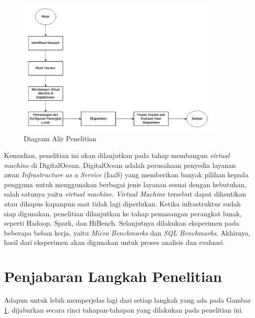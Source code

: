 \begin{figure}[h!]
    \centering
    \includegraphics[width=0.9\textwidth]{figures/ch03/Diagram Tugas Akhir.png}
    \caption{Diagram Alir Penelitian}
    \label{fig:diagram alir}
\end{figure}

Kemudian, penelitian ini akan dilanjutkan pada tahap membangun \textit{virtual machine} di DigitalOcean. DigitalOcean adalah perusahaan penyedia layanan awan \textit{Infrastructure as a Service} (IaaS) yang memberikan banyak pilihan kepada pengguna untuk menggunakan berbagai jenis layanan sesuai dengan kebutuhan, salah satunya yaitu \textit{virtual machine}. \textit{Virtual Machine} tersebut dapat dihentikan atau dihapus kapanpun saat tidak lagi diperlukan. Ketika infrastruktur sudah siap digunakan, penelitian dilanjutkan ke tahap pemasangan perangkat lunak, seperti Hadoop, Spark, dan HiBench. Selanjutnya dilakukan eksperimen pada beberapa beban kerja, yaitu \textit{Micro Benchmarks} dan \textit{SQL Benchmarks}. Akhirnya, hasil dari eksperimen akan digunakan untuk proses analisis dan evaluasi.

\section{Penjabaran Langkah Penelitian}
Adapun untuk lebih memperjelas lagi dari setiap langkah yang ada pada Gambar \ref{fig:diagram alir}, dijabarkan secara rinci tahapan-tahapan yang dilakukan pada penelitian ini.

